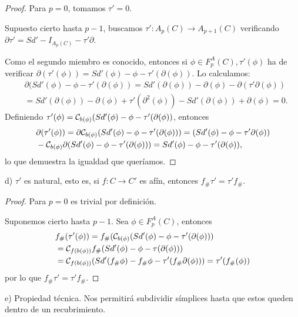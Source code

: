 \begin{proof}
  Para $p = 0$, tomamos $\tau' = 0$.

  Supuesto cierto hasta $p-1$, buscamos $\tau' \colon A_p(C) \to A_{p+1}(C)$ verificando $\partial \tau' = Sd' - I_{A_p(C)} - \tau' \partial$.

  Como el segundo miembro es conocido, entonces si $\phi \in F_p^A(C), \tau'(\phi)$ ha de verificar
  $\partial(\tau'(\phi)) = Sd'(\phi) - \phi - \tau'(\partial(\phi))$. Lo calculamos:
  \begin{align*}
    &\partial(Sd'(\phi) - \phi - \tau'(\partial(\phi)) = Sd'(\partial(\phi)) - \partial(\phi) - \partial(\tau' \partial(\phi)) \\
    &= Sd'(\partial(\phi)) - \partial(\phi) + \tau'(\partial^2(\phi)) - Sd'(\partial(\phi)) + \partial(\phi) = 0.
  \end{align*}
  Definiendo $\tau'(\phi) = {\mathcal C}_{b(\phi)}(Sd'(\phi) - \phi - \tau'(\partial(\phi))$, entonces
  \begin{align*}
    &\partial(\tau'(\phi)) = \partial {\mathcal C}_{b(\phi)}(Sd'(\phi) - \phi -\tau'(\partial(\phi))) = (Sd'(\phi) - \phi - \tau' \partial(\phi)) \\
    &- {\mathcal C}_{b(\phi)} \partial(Sd'(\phi) - \phi - \tau'(\partial(\phi))) = Sd'(\phi) - \phi - \tau'(\partial(\phi)),
  \end{align*}
  lo que demuestra la igualdad que queríamos.
\end{proof}

d) $\tau'$ es natural, esto es, si $f \colon C \to C'$ es afín, entonces $f_\# \tau' = \tau' f_\#$.

\begin{proof}
  Para $p = 0$ es trivial por definición.

  Suponemos cierto hasta $p-1$. Sea $\phi \in F_p^A(C)$, entonces
  \begin{align*}
    &f_\#(\tau'(\phi)) = f_\#({\mathcal C}_{b(\phi)}(Sd'(\phi) - \phi - \tau'(\partial(\phi))) \\
    &= {\mathcal C}_{f(b(\phi))} f_\#(Sd'(\phi) - \phi - \tau(\partial(\phi))) \\
    &= {\mathcal C}_{f(b(\phi))}(Sd'(f_\# \phi) - f_\# \phi - \tau'(f_\# \partial(\phi))) = \tau'(f_\#(\phi))
  \end{align*}
  por lo que $f_\# \tau' = \tau' f_\#$.
\end{proof}

e) Propiedad técnica. Nos permitirá subdividir símplices hasta que estos queden dentro de un recubrimiento.


